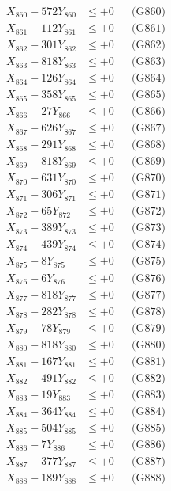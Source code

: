 \documentclass[a4paper,10pt]{article}
\begin{document}
{\begin{align}
X_{860} - 572Y_{860} &\leq +0 && \text{(G860)} \\
\allowbreak
X_{861} - 112Y_{861} &\leq +0 && \text{(G861)} \\
X_{862} - 301Y_{862} &\leq +0 && \text{(G862)} \\
X_{863} - 818Y_{863} &\leq +0 && \text{(G863)} \\
X_{864} - 126Y_{864} &\leq +0 && \text{(G864)} \\
X_{865} - 358Y_{865} &\leq +0 && \text{(G865)} \\
X_{866} - 27Y_{866} &\leq +0 && \text{(G866)} \\
X_{867} - 626Y_{867} &\leq +0 && \text{(G867)} \\
X_{868} - 291Y_{868} &\leq +0 && \text{(G868)} \\
X_{869} - 818Y_{869} &\leq +0 && \text{(G869)} \\
X_{870} - 631Y_{870} &\leq +0 && \text{(G870)} \\
\allowbreak
X_{871} - 306Y_{871} &\leq +0 && \text{(G871)} \\
X_{872} - 65Y_{872} &\leq +0 && \text{(G872)} \\
X_{873} - 389Y_{873} &\leq +0 && \text{(G873)} \\
X_{874} - 439Y_{874} &\leq +0 && \text{(G874)} \\
X_{875} - 8Y_{875} &\leq +0 && \text{(G875)} \\
X_{876} - 6Y_{876} &\leq +0 && \text{(G876)} \\
X_{877} - 818Y_{877} &\leq +0 && \text{(G877)} \\
X_{878} - 282Y_{878} &\leq +0 && \text{(G878)} \\
X_{879} - 78Y_{879} &\leq +0 && \text{(G879)} \\
X_{880} - 818Y_{880} &\leq +0 && \text{(G880)} \\
\allowbreak
X_{881} - 167Y_{881} &\leq +0 && \text{(G881)} \\
X_{882} - 491Y_{882} &\leq +0 && \text{(G882)} \\
X_{883} - 19Y_{883} &\leq +0 && \text{(G883)} \\
X_{884} - 364Y_{884} &\leq +0 && \text{(G884)} \\
X_{885} - 504Y_{885} &\leq +0 && \text{(G885)} \\
X_{886} - 7Y_{886} &\leq +0 && \text{(G886)} \\
X_{887} - 377Y_{887} &\leq +0 && \text{(G887)} \\
X_{888} - 189Y_{888} &\leq +0 && \text{(G888)} \\

\end{align}}
\end{document}
